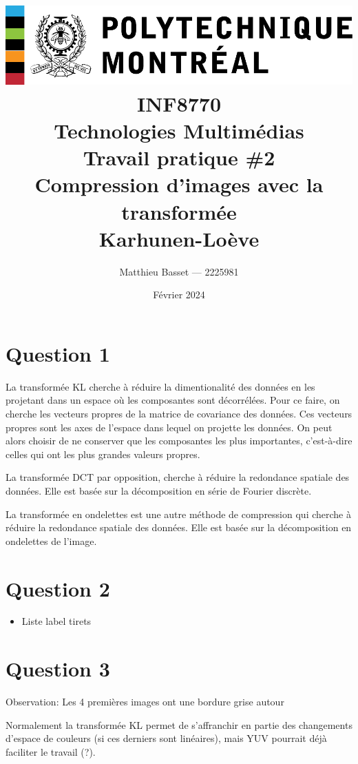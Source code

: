 \documentclass{article}[letterpaper, 11pt]
\title{
    \includegraphics[scale=0.8]{poly-logo.pdf}\\\vspace*{50pt}
    \huge\textbf{INF8770}\\
    \textbf{Technologies Multimédias}\\
    Travail pratique \#2\\
    Compression d'images avec la transformée \\Karhunen-Loève\\
}
\author{\Large Matthieu Basset --- 2225981}
\date{\huge Février 2024}
\renewcommand{\thepage}{}
\begin{document}
\thispagestyle{empty}
\maketitle

\newpage

\renewcommand{\thepage}{\arabic{page}}
\pagestyle{fancy}
\renewcommand{\contentsname}{Table des matières}
\setcounter{page}{1}

\tableofcontents


\newpage
\section{Question 1}
La transformée KL cherche à réduire la dimentionalité des données en les projetant dans un espace où les composantes sont décorrélées. Pour ce faire, on cherche les vecteurs propres de la matrice de covariance des données.
Ces vecteurs propres sont les axes de l'espace dans lequel on projette les données.
On peut alors choisir de ne conserver que les composantes les plus importantes, c'est-à-dire celles qui ont les plus grandes valeurs propres.

La transformée DCT par opposition, cherche à réduire la redondance spatiale des données. Elle est basée sur la décomposition en série de Fourier discrète.

La transformée en ondelettes est une autre méthode de compression qui cherche à réduire la redondance spatiale des données. Elle est basée sur la décomposition en ondelettes de l'image.

\newpage
\section{Question 2}


\begin{itemize}[label={--}]
	\item Liste label tirets
\end{itemize}


\newpage
\section{Question 3}
Observation: Les 4 premières images ont une bordure grise autour

Normalement la transformée KL permet de s'affranchir en partie des changements d'espace de couleurs (si ces derniers sont linéaires), mais YUV pourrait déjà faciliter le travail (?).
\end{document}
